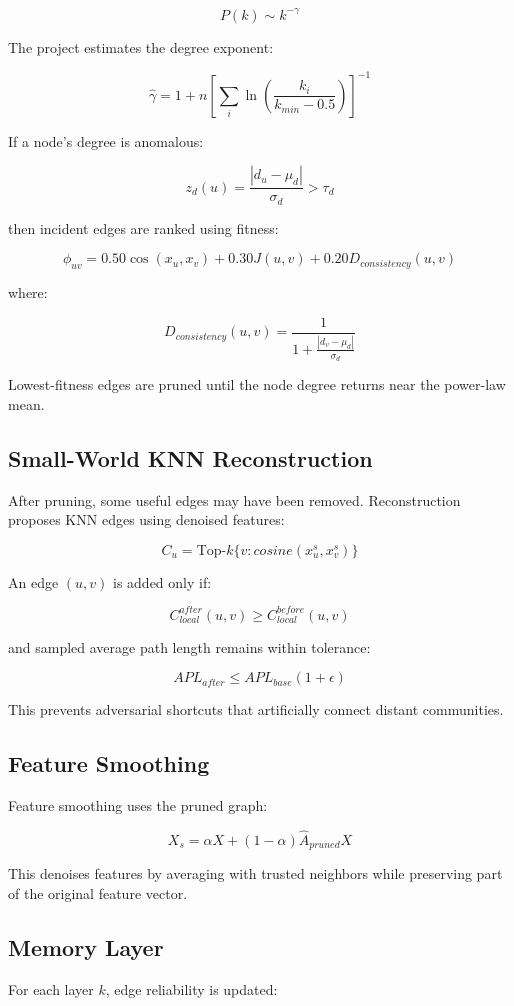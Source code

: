 \documentclass[12pt,a4paper]{article}
\begin{document}
$$
P(k)\sim k^{-\gamma}
$$

The project estimates the degree exponent:

$$
\hat{\gamma}=1+n\left[\sum_i \ln\left(\frac{k_i}{k_{min}-0.5}\right)\right]^{-1}
$$

If a node's degree is anomalous:

$$
z_d(u)=\frac{|d_u-\mu_d|}{\sigma_d}>\tau_d
$$

then incident edges are ranked using fitness:

$$
\phi_{uv}=0.50\cos(x_u,x_v)+0.30J(u,v)+0.20D_{consistency}(u,v)
$$

where:

$$
D_{consistency}(u,v)=\frac{1}{1+\frac{|d_v-\mu_d|}{\sigma_d}}
$$

Lowest-fitness edges are pruned until the node degree returns near the power-law mean.

\subsection{Small-World KNN Reconstruction}
After pruning, some useful edges may have been removed. Reconstruction proposes KNN edges using denoised features:

$$
C_u=\text{Top-}k\{v:cosine(x_u^s,x_v^s)\}
$$

An edge $(u,v)$ is added only if:

$$
C_{local}^{after}(u,v)\geq C_{local}^{before}(u,v)
$$

and sampled average path length remains within tolerance:

$$
APL_{after}\leq APL_{base}(1+\epsilon)
$$

This prevents adversarial shortcuts that artificially connect distant communities.

\subsection{Feature Smoothing}
Feature smoothing uses the pruned graph:

$$
X_s=\alpha X+(1-\alpha)\hat{A}_{pruned}X
$$

This denoises features by averaging with trusted neighbors while preserving part of the original feature vector.

\subsection{Memory Layer}
For each layer $k$, edge reliability is updated:
\end{document}
